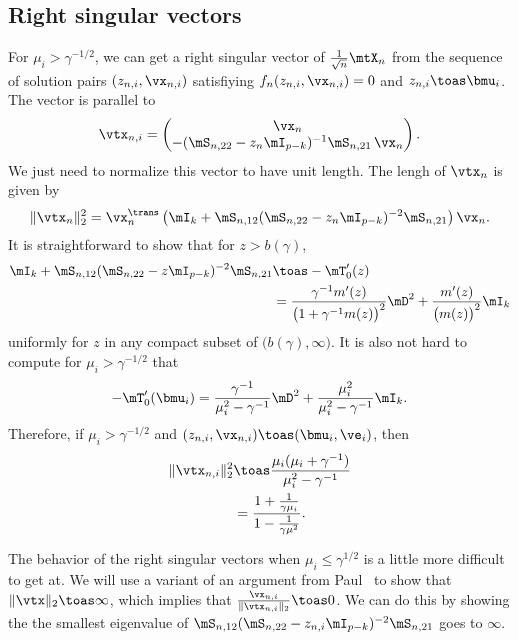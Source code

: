 \subsection{Right singular vectors}

For $\mu_i > \gamma^{-1/2}$, we can get a right singular vector of $\frac{1}{\sqrt{n}} \mtX_n$ from the sequence of solution pairs 
$(z_{n,i}, \vx_{n,i})$ satisfiying 
$f_n(z_{n,i}, \vx_{n,i}) = 0$ and $z_{n,i} \toas \bmu_i$.  The vector
is parallel to
\[
    \vtx_{n,i}
    =
    \left(
    \begin{matrix}
        \vx_n \\
        - ( \mS_{n,22} - z_n \mI_{p-k} )^{-1} \mS_{n,21} \, \vx_n
    \end{matrix}
    \right).
\]
We just need to normalize this vector to have unit length.  The lengh
of $\vtx_n$ is given by
\[
    \| \vtx_n \|_2^2
        =
        \vx_n^\trans
        \left(
            \mI_{k}
            +
            \mS_{n,12}
            ( \mS_{n,22} - z_n \mI_{p-k} )^{-2} 
            \mS_{n,21}
        \right)
        \vx_n.
\]
It is straightforward to show that for $z > b(\gamma)$,
\begin{align*}
    \mI_{k}
    +
    \mS_{n,12}
    ( \mS_{n,22} - z \mI_{p-k} )^{-2} 
    \mS_{n,21}
        &\toas
            -\mT_0'(z) \\
        &= \frac{ \gamma^{-1} m'(z) }
                { \big( 1 + \gamma^{-1} m(z) \big)^2 }
           \mD^2
           +
           \frac{ m'(z) }{ \big( m(z) \big)^2 }
           \mI_k
\end{align*}
uniformly for $z$ in any compact subset of $\big( b(\gamma), \infty \big)$.
It is also not hard to compute for $\mu_i > \gamma^{-1/2}$ that
\[
    -\mT_0'( \bmu_i )
        =
            \frac{ \gamma^{-1} }{ \mu_i^2 - \gamma^{-1} }
            \mD^2
            +
            \frac{ \mu_i^2 }{ \mu_i^2 - \gamma^{-1} }
            \mI_k.
\]
Therefore, if $\mu_i > \gamma^{-1/2}$ and 
$(z_{n,i}, \vx_{n,i}) \toas (\bmu_i, \ve_i)$, then
\begin{align*}
    \| \vtx_{n,i} \|_2^2
        &\toas
            \frac{ \mu_i ( \mu_i + \gamma^{-1} ) }
                 { \mu_i^2 - \gamma^{-1} } \\
        &=
            \frac{ 1 + \tfrac{1}{ \gamma \mu_i} }
                 { 1 - \tfrac{1}{ \gamma \mu^2} }.
\end{align*}

The behavior of the right singular vectors when $\mu_i \leq \gamma^{1/2}$ is
a little more difficult to get at.  We will use a variant of an argument from Paul~\cite{paul2007ase} to show that $\| \vtx \|_2 \toas \infty$, which implies that $\frac{ \vx_{n,i} }{ \| \vtx_{n,i} \|_2 } \toas 0$.  We can
do this by showing the the smallest eigenvalue of 
\(
    \mS_{n,12}
    ( \mS_{n,22} - z_{n,i} \mI_{p-k} )^{-2} 
    \mS_{n,21}
\)
goes to $\infty$.

